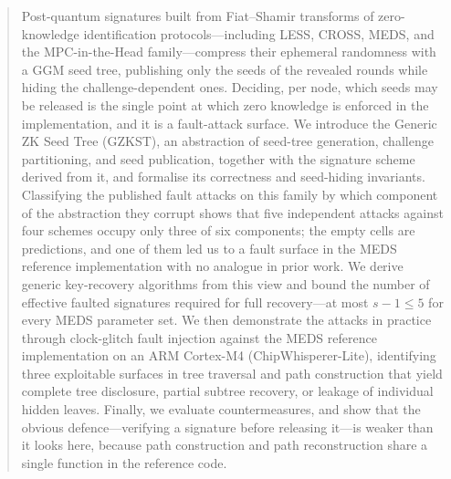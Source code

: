 \documentclass[runningheads]{llncs}
\begin{document}
\begin{abstract}
Post-quantum signatures built from Fiat--Shamir transforms of zero-knowledge
identification protocols---including LESS, CROSS, MEDS, and the
MPC-in-the-Head family---compress their ephemeral randomness with a GGM seed
tree, publishing only the seeds of the revealed rounds while hiding the
challenge-dependent ones. Deciding, per node, which seeds may be released is
the single point at which zero knowledge is enforced in the implementation,
and it is a fault-attack surface.
We introduce the Generic ZK Seed Tree (GZKST), an abstraction of seed-tree
generation, challenge partitioning, and seed publication, together with the
signature scheme derived from it, and formalise its correctness and
seed-hiding invariants. Classifying the published fault attacks on this family
by which component of the abstraction they corrupt shows that five independent
attacks against four schemes occupy only three of six components; the empty
cells are predictions, and one of them led us to a fault surface in the MEDS
reference implementation with no analogue in prior work.
We derive generic key-recovery algorithms from this view and bound the number
of effective faulted signatures required for full recovery---at most $s-1
\leq 5$ for every MEDS parameter set. We then demonstrate the attacks in
practice through clock-glitch fault injection against the MEDS reference
implementation on an ARM Cortex-M4 (ChipWhisperer-Lite), identifying three
exploitable surfaces in tree traversal and path construction that yield
complete tree disclosure, partial subtree recovery, or leakage of individual
hidden leaves. Finally, we evaluate countermeasures, and show that the obvious
defence---verifying a signature before releasing it---is weaker than it looks
here, because path construction and path reconstruction share a single
function in the reference code.
\end{abstract}
  \makeatletter%
\begingroup%
 \makeatletter%
 \def\@thefnmark{$*$}\relax%
\endgroup
\end{document}
